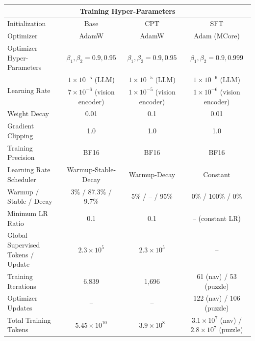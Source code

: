 \begin{table}[t!]
\begin{center}
{\begin{tabular}{lccc}
\midrule[0.6pt]
\multicolumn{4}{c}{\textbf{Training Hyper-Parameters}} \\
\midrule[0.6pt]
Initialization & Base & CPT & SFT \\
Optimizer & AdamW & AdamW & Adam (MCore) \\
Optimizer Hyper-Parameters & $\beta_1,\beta_2=0.9,0.95$ & $\beta_1,\beta_2=0.9,0.95$ & $\beta_1,\beta_2=0.9,0.999$ \\
\multirow{2}{*}{Learning Rate}
& $1\times10^{-5}$ (LLM) & $1\times10^{-5}$ (LLM) & $1\times10^{-6}$ (LLM) \\
& $7\times10^{-6}$ (vision encoder) & $1\times10^{-5}$ (vision encoder) & $1\times10^{-6}$ (vision encoder) \\
Weight Decay & 0.01 & 0.1 & 0.01 \\
Gradient Clipping & 1.0 & 1.0 & 1.0 \\
Training Precision & BF16 & BF16 & BF16 \\
Learning Rate Scheduler & Warmup-Stable-Decay & Warmup-Decay & Constant \\
Warmup / Stable / Decay & 3\% / 87.3\% / 9.7\% & 5\% / -- / 95\% & 0\% / 100\% / 0\% \\
Minimum LR Ratio & 0.1 & 0.1 & -- (constant LR) \\
Global Supervised Tokens / Update & $2.3\times10^{5}$ & $2.3\times10^{5}$ & -- \\
Training Iterations & 6,839 & 1,696 & 61 (nav) / 53 (puzzle) \\
Optimizer Updates & -- & -- & 122 (nav) / 106 (puzzle) \\
Total Training Tokens & $5.45\times10^{10}$ & $3.9\times10^{8}$ & $3.1\times10^{7}$ (nav) / $2.8\times10^{7}$ (puzzle) \\


\end{tabular}}
\end{center}
\end{table}
